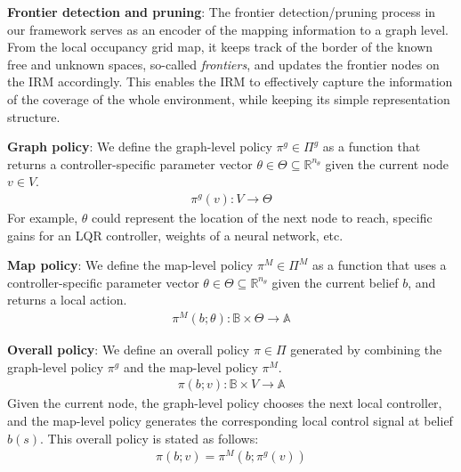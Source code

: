 \documentclass{article}
\newcommand{\ph}[1]{{\textbf{#1}:}} %
\newcommand{\note}[1]{{\color{cyan} NOTE: #1 }}
\begin{document}






\ph{Frontier detection and pruning}
The frontier detection/pruning process in our framework serves as an encoder of the mapping information to a graph level.
From the local occupancy grid map, it keeps track of the border of the known free and unknown spaces, so-called \textit{frontiers}, and updates the frontier nodes on the IRM accordingly.
This enables the IRM to effectively capture the information of the coverage of the whole environment, while keeping its simple representation structure.


\ph{Graph policy}
We define the graph-level policy $\pi^g \in \Pi^g$ as a function that returns a controller-specific parameter vector $\theta\in\Theta\subseteq\mathbb{R}^{n_\theta}$ given the current node $v \in V$.
\begin{align}
    \pi^g(v): V\rightarrow \Theta
\end{align}
For example, $\theta$ could represent the location of the next node to reach, specific gains for an LQR controller, weights of a neural network, etc.

\ph{Map policy}
We define the map-level policy $\pi^M \in \Pi^M$ as a function that uses a controller-specific parameter vector $\theta\in\Theta\subseteq\mathbb{R}^{n_\theta}$ given the current belief $b$, and returns a local action.
\begin{align}
    \pi^M(b;\theta): \mathbb{B}\times\Theta\rightarrow \mathbb{A}
\end{align}

\ph{Overall policy}
We define an overall policy $\pi \in \Pi$ generated by combining the graph-level policy $\pi^g$ and the map-level policy $\pi^M$.
\begin{align}
    \pi(b;v):\mathbb{B}\times V\rightarrow \mathbb{A}
\end{align}
Given the current node, the graph-level policy chooses the next local controller, and the map-level policy generates the corresponding local control signal at belief $b(s)$. This overall policy is stated as follows:
\begin{align}
    \pi(b;v) = \pi^M(b; \pi^g(v))
\end{align}
\end{document}
